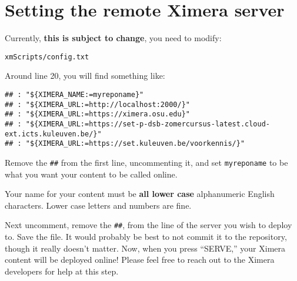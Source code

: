 \documentclass{ximera}
\begin{document}

\section{Setting the remote Ximera server}

Currently,  \textbf{this is subject to change}, you need to modify:
\begin{verbatim}
xmScripts/config.txt
\end{verbatim}
Around line 20, you will find something like:
\begin{verbatim}
## : "${XIMERA_NAME:=myreponame}"
## : "${XIMERA_URL:=http://localhost:2000/}"
## : "${XIMERA_URL:=https://ximera.osu.edu}"
## : "${XIMERA_URL:=https://set-p-dsb-zomercursus-latest.cloud-ext.icts.kuleuven.be/}"
## : "${XIMERA_URL:=https://set.kuleuven.be/voorkennis/}"
\end{verbatim}
Remove the \verb!##! from the first line, uncommenting it, and set
\verb!myreponame! to be what
you want your content to be called online.
\begin{warning}
    Your name for your content must be \textbf{all lower case} alphanumeric
    English characters. Lower case letters and numbers are fine.
\end{warning}
Next uncomment, remove the \verb!##!, from the line of the server you wish to
deploy to. Save the file. It would probably be best to not commit it to the
repository, though it really doesn't matter. Now, when you press ``SERVE,''
your Ximera content will be deployed online! Please feel free to reach out to
the Ximera developers  for help at this step.
\end{document}

